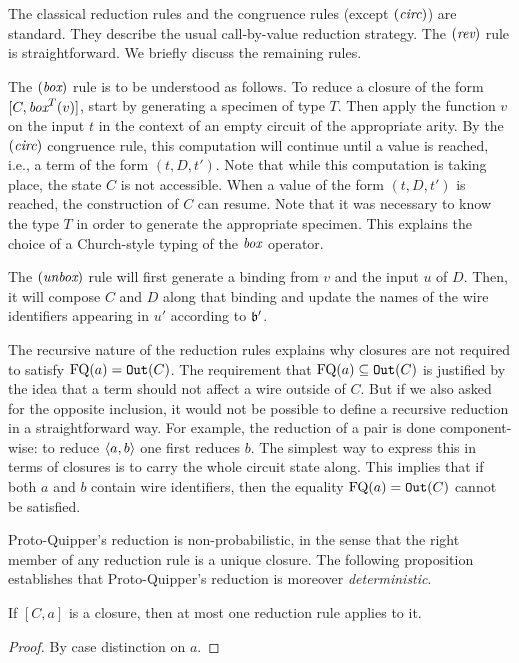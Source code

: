 \documentclass[twoside]{article}
\begin{document}
The classical reduction rules and the congruence rules (except $(\textit{circ})$) 
are standard. They describe the usual call-by-value reduction strategy. 
The $(\mathop{\textit{rev}}\nolimits)$ rule is straightforward. We briefly discuss the remaining 
rules. 

The $(\mathop{\textit{box}}\nolimits)$ rule is to be understood as follows. To reduce a closure
of the form $[C, \mathop{\textit{box}}\nolimits^T(v)]$, start by generating a specimen of type
$T$. Then apply the function $v$ on the input $t$ in the context of an
empty circuit of the appropriate arity.  By the $(\textit{circ})$
congruence rule, this computation will continue until a value is
reached, i.e., a term of the form $(t,D,t')$. Note that while this
computation is taking place, the state $C$ is not accessible. When a
value of the form $(t,D,t')$ is reached, the construction of $C$ can
resume. Note that it was necessary to know the type $T$ in order to
generate the appropriate specimen. This explains the choice of a
Church-style typing of the $\mathop{\textit{box}}\nolimits$ operator. 

The $(\mathop{\textit{unbox}}\nolimits)$ rule will first generate a binding from $v$ and the
input $u$ of $D$. Then, it will compose $C$ and $D$ along that binding
and update the names of the wire identifiers appearing in $u'$
according to $\mathfrak{b}'$. 

The recursive nature of the reduction rules explains why closures are 
not required to satisfy $\mathop{\textrm{FQ}}\nolimits(a)=\mathtt{Out}(C)$. The requirement that 
$\mathop{\textrm{FQ}}\nolimits(a)\subseteq \mathtt{Out}(C)$ is justified by the idea that a term 
should not affect a wire outside of $C$. But if we also asked for the 
opposite inclusion, it would not be possible to define a recursive
reduction in a straightforward way. For example, the reduction of a 
pair is done component-wise: to reduce $\langle a,b\rangle$ one first reduces $b$. 
The simplest way to express this in terms of closures is to carry the 
whole circuit state along. This implies that if both $a$ and $b$ 
contain wire identifiers, then the equality $\mathop{\textrm{FQ}}\nolimits(a)=\mathtt{Out}(C)$ 
cannot be satisfied.

Proto-Quipper's reduction is non-probabilistic, in the sense that the 
right member of any reduction rule is a unique closure. The following 
proposition establishes that Proto-Quipper's reduction is moreover  
\emph{deterministic}.

\begin{proposition}
\label{determinicity}
If $[C,a]$ is a closure, then at most one reduction rule applies
to it.
\end{proposition}

\begin{proof}
By case distinction on $a$.
\end{proof}
\end{document}

